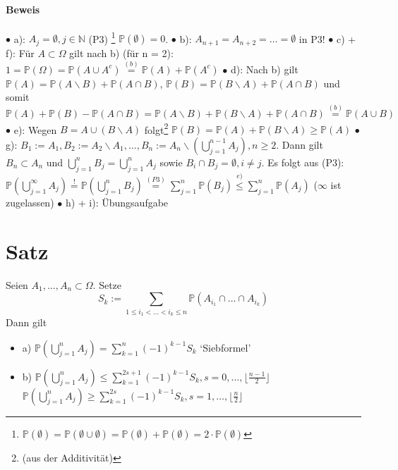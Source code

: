 \documentclass[a4paper,11pt,notitlepage]{report}
\newcommand{\N}{{\ensuremath{\mathbb{N}}}}
\newcommand{\Prim}{{\ensuremath{\mathbb{P}}}}
\begin{document}
\paragraph{Beweis}
$\bullet$ a): $A_j = \emptyset, j \in \N$ (P3) \footnote{$\Prim(\emptyset) = \Prim(\emptyset \cup \emptyset) = \Prim(\emptyset) + \Prim(\emptyset) = 2 \cdot \Prim(\emptyset)$} $\Prim(\emptyset) = 0$.
\newline
$\bullet$ b): $A_{n+1} = A_{n+2} = \ldots = \emptyset$ in P3!
\newline
$\bullet$ c) + f): Für $A \subset \Omega$ gilt nach b) (für n = 2): \newline
	$1 = \Prim(\Omega) = \Prim(A \cup A^c) \overset{(b)}{=} \Prim(A) + \Prim(A^c)$
\newline
$\bullet$ d): Nach b) gilt $\Prim(A) = \Prim(A \backslash B) + \Prim(A \cap B)$, $\Prim(B) = \Prim(B \backslash A) + \Prim(A \cap B)$ und somit $\Prim(A) + \Prim(B) - \Prim(A \cap B) = \Prim(A \backslash B) + \Prim (B \backslash A) + \Prim(A \cap B) \overset{(b)}{=} \Prim(A \cup B)$
\newline
$\bullet$ e): Wegen $B = A \cup (B \backslash A)$ folgt\footnote{(aus der Additivität)}
	$\Prim(B) = \Prim(A) + \Prim(B \backslash A) \geq \Prim(A)$
\newline
$\bullet$ g): $B_1 := A_1, B_2 := A_2 \backslash A_1, \ldots , B_n := A_n \backslash (\bigcup \limits_{j=1}^{n-1}{A_j}), n \geq 2$.
\newline
Dann gilt $B_n \subset A_n$ und $\bigcup\limits_{j=1}^{n}{B_j} = \bigcup\limits_{j=1}^{n}{A_j}$ sowie $B_i \cap B_j = \emptyset, i \neq j.$
\newline
Es folgt aus (P3):
\newline
$\Prim(\bigcup\limits_{j=1}^{\infty}{A_j}) \overset{!}{=} \Prim(\bigcup\limits_{j=1}^{n}{B_j}) \overset {(P3)} {=} \sum\limits_{j=1}^{n}{\Prim(B_j)} \overset {e)}{\leq} \sum\limits_{j=1}^{n}{\Prim(A_j)}$ ($\infty$ ist zugelassen)
\newline
$\bullet$ h) + i): Übungsaufgabe

\section{Satz}
Seien $A_1, \ldots, A_n \subset \Omega.$ Setze
$$S_k := \sum\limits_{1 \leq i_1 < \ldots < i_k \leq n}{\Prim(A_{i_1} \cap \ldots \cap A_{i_k})}$$
Dann gilt
\begin{itemize}
	\item a) $\Prim(\bigcup\limits_{j=1}^{n}{A_j}) = \sum\limits_{k=1}^{n}{(-1)^{k-1} S_k}$ `Siebformel'
	\item b) $\Prim(\bigcup\limits_{j=1}^{n}{A_j}) \leq \sum\limits_{k=1}^{2s+1}{(-1)^{k-1}S_k}, s = 0, \ldots, \lfloor \frac{n-1}{2} \rfloor$
	\newline
	$\Prim(\bigcup\limits_{j=1}^{n}{A_j}) \geq \sum\limits_{k=1}^{2s}{(-1)^{k-1}S_k}, s = 1, \ldots, \lfloor \frac{n}{2} \rfloor$
\end{itemize}
\end{document}
